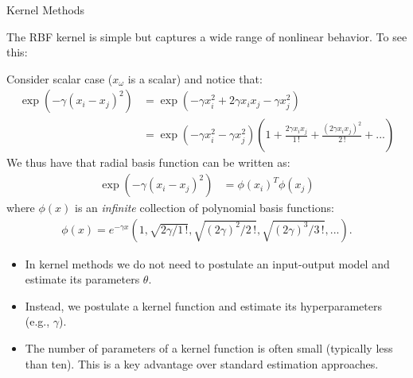 \documentclass[9pt]{beamer}
\begin{document}
\begin{frame}{Kernel Methods}

The RBF kernel is simple but captures a wide range of nonlinear behavior. To see this:
\begin{block}{}
Consider scalar case ($x_\omega$ is a scalar) and notice that:
\begin{align*}
\exp(-\gamma(x_i-x_j)^2)&=\exp(-\gamma x_i^2+2\gamma x_ix_j-\gamma x_j^2)\\
&=\exp(-\gamma x_i^2-\gamma x_j^2)\left(1+\frac{2\gamma x_ix_j}{1\, !}+\frac{(2\gamma x_ix_j)^2}{2\,!}+...\right)
\end{align*}
We thus have that radial basis function can be written as:
\begin{align*}
\exp(-\gamma(x_i-x_j)^2)&=\phi(x_i)^T\phi(x_j)
\end{align*}
where $\phi(x)$ is an {\em infinite} collection of polynomial basis functions: 
\begin{align*}
\phi(x)=e^{-\gamma x}(1,\sqrt{2\gamma/1\,!},\sqrt{(2\gamma)^2/2\,!},\sqrt{(2\gamma)^3/3\,!},...). 
\end{align*}
\end{block}
\begin{itemize}
\item In kernel methods we do not need to postulate an input-output model and estimate its parameters $\theta$.  
\item Instead, we postulate a kernel function and estimate its hyperparameters (e.g., $\gamma$).  
\item The number of parameters of a kernel function is often small (typically less than ten). This is a key advantage over standard estimation approaches. 
\end{itemize}


\end{frame}
\end{document}

